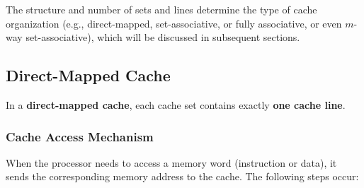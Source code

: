 \documentclass[12pt]{book}
\begin{document}
The structure and number of sets and lines determine the type of cache organization (e.g., direct-mapped, set-associative, or fully associative, or even $m$-way set-associative), which will be discussed in subsequent sections.

\subsection{Direct-Mapped Cache}
In a \textbf{direct-mapped cache}, each cache set contains exactly \textbf{one cache line}. 


\subsubsection*{Cache Access Mechanism}
When the processor needs to access a memory word (instruction or data), it sends the corresponding memory address to the cache. The following steps occur:
\end{document}
